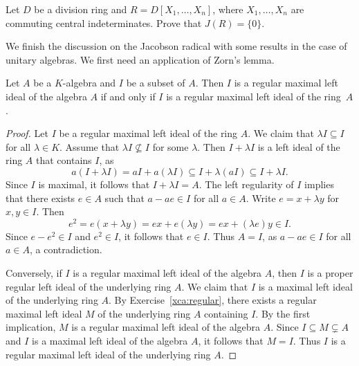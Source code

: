 \begin{exercise}
    Let $D$ be a division ring and $R=D[X_1,\dots,X_n]$, 
    where $X_1,\ldots,X_n$ are commuting central indeterminates. 
    Prove that 
    $J(R)=\{0\}$. 
\end{exercise}

We finish the discussion on the Jacobson radical with 
some results in the case of unitary algebras. We first need an application of Zorn's lemma. 



\begin{proposition}
	Let $A$ be a $K$-algebra and $I$ be a subset of $A$. Then $I$ is 
	a regular maximal left ideal of the algebra $A$ if and only if $I$ is 
	a regular maximal left ideal of the ring~$A$.
\end{proposition}

\begin{proof}
	Let $I$ be a regular maximal left ideal of the ring $A$. We claim that
	$\lambda I\subseteq I$ for all $\lambda\in K$. Assume that 
	$\lambda I\not\subseteq I$ for some $\lambda$. Then $I+\lambda I$
	is a left ideal of the ring $A$ that contains $I$, as 
	\[
	a(I+\lambda I)=aI+a(\lambda I)\subseteq I+\lambda (aI)\subseteq I+\lambda I.
	\]
	Since $I$ is maximal, it follows that $I+\lambda I=A$. 
	The left regularity of $I$ implies that there exists $e\in A$
	such that 
	$a-ae\in I$ for all $a\in A$. Write $e=x+\lambda y$ for $x,y\in
	I$. Then 
	\[
		e^2=e(x+\lambda y)=ex+e(\lambda y)=ex+(\lambda e)y\in I.
	\]
	Since $e-e^2\in I$ and $e^2\in I$, it follows that $e\in I$. Thus $A=I$, as
	$a-ae\in I$ for all $a\in A$, a contradiction.

	Conversely, if $I$ is a regular maximal left ideal of the algebra $A$, then 
	$I$ is a proper regular left ideal of the underlying ring $A$. We claim that $I$ is a maximal left ideal of the underlying ring $A$. 
    By Exercise~\ref{xca:regular}, there exists a regular maximal left ideal $M$ of the underlying ring $A$ containing $I$. By the first implication, $M$ is a regular maximal left ideal
    of the algebra $A$.
    Since $I\subseteq M\subsetneq A$ and $I$ is a maximal left ideal of the algebra $A$, it follows that $M=I$. Thus $I$ is a regular
    maximal left ideal of the underlying ring $A$.  
\end{proof}

